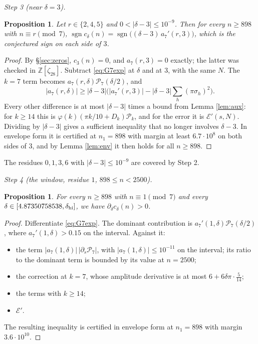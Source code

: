 \documentclass[11pt]{amsart}
\newtheorem{proposition}[theorem]{Proposition}
\theoremstyle{remark}
\newcommand{\Z}{\mathbb Z}\newcommand{\Q}{\mathbb Q}\newcommand{\C}{\mathbb C}
\newcommand{\cP}{\mathcal P}\newcommand{\cE}{\mathcal E}\newcommand{\e}{\mathrm e}
\newcommand{\sgn}{\operatorname{sgn}}\newcommand{\Arg}{\operatorname{Arg}}
\begin{document}
\emph{Step 3 (near $\delta=3$).}
\begin{proposition}\label{prop:eps3}
Let $r\in\{2,4,5\}$ and $0<|\delta-3|\le10^{-9}$. Then for every $n\ge898$ with $n\equiv r\pmod 7$, $\sgn c_\delta(n)=\sgn\big((\delta-3)\,a_7'(r,3)\big)$, which is the conjectured sign on each side of $3$.
\end{proposition}
\begin{proof}
By \S\ref{sec:zeros}, $c_3(n)=0$, and $a_7(r,3)=0$ exactly; the latter was checked in $\Z[\zeta_{28}]$. Subtract \eqref{eq:G7exp} at $\delta$ and at $3$, with the same $N$. The $k=7$ term becomes $a_7(r,\delta)\cP_7(\delta/2)$, and
\[
|a_7(r,\delta)|\ge|\delta-3|\Big(|a_7'(r,3)|-|\delta-3|\sum_h(\pi\sigma_h)^2\Big).
\]
Every other difference is at most $|\delta-3|$ times a bound from Lemma \ref{lem:aux}: for $k\ge14$ this is $\varphi(k)(\pi k/10+D_k)\cP_k$, and for the error it is $\cE'(s,N)$. Dividing by $|\delta-3|$ gives a sufficient inequality that no longer involves $\delta-3$. In envelope form it is certified at $n_1=898$ with margin at least $6.7\cdot10^8$ on both sides of $3$, and by Lemma \ref{lem:env} it then holds for all $n\ge898$.
\end{proof}
The residues $0,1,3,6$ with $|\delta-3|\le10^{-9}$ are covered by Step 2.

\emph{Step 4 (the window, residue $1$, $898\le n<2500$).}
\begin{proposition}\label{prop:window}
For every $n\ge898$ with $n\equiv1\pmod7$ and every $\delta\in[4.87350758538,\delta_{\rm hi}]$, we have $\partial_\delta c_\delta(n)>0$.
\end{proposition}
\begin{proof}
Differentiate \eqref{eq:G7exp}. The dominant contribution is $a_7'(1,\delta)\cP_7(\delta/2)$, where $a_7'(1,\delta)>0.15$ on the interval. Against it:
\begin{itemize}[leftmargin=2em]
\item the term $|a_7(1,\delta)|\,|\partial_s\cP_7|$, with $|a_7(1,\delta)|\le10^{-11}$ on the interval; its ratio to the dominant term is bounded by its value at $n=2500$;
\item the correction at $k=7$, whose amplitude derivative is at most $6+6\delta\pi\cdot\frac5{14}$;
\item the terms with $k\ge14$;
\item $\cE'$.
\end{itemize}
The resulting inequality is certified in envelope form at $n_1=898$ with margin $3.6\cdot10^{10}$.
\end{proof}
\end{document}
